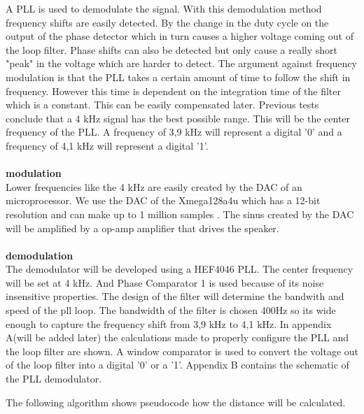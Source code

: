 \documentclass[10pt,a4paper]{article}
\begin{document}
A PLL is used to demodulate the signal. With this demodulation method frequency shifts are easily detected. By the change in the duty cycle on the output of the phase detector which in turn causes a higher voltage coming out of the loop filter. Phase shifts can also be detected but only cause a really short "peak" in the voltage which are harder to detect. The argument against frequency modulation is that the PLL takes a certain amount of time to follow the shift in frequency. However this time is dependent on the integration time of the filter which is a constant. This can be easily compensated later. Previous tests conclude that a 4 kHz signal has the best possible range. This will be the center frequency of the PLL. A frequency of 3,9 kHz will represent a digital '0' and a frequency of 4,1 kHz will represent a digital '1'.\\\\
\textbf{modulation}\\
Lower frequencies like the 4 kHz are easily created by the DAC of an microprocessor. We use the DAC of the Xmega128a4u which has a 12-bit resolution and can make up to 1 million samples \cite{xmegadata}. The sinus created by the DAC will be amplified by a op-amp amplifier that drives the speaker.\\\\
\textbf{demodulation}\\
The demodulator will be developed using a HEF4046 PLL. The center frequency will be set at 4 kHz. And Phase Comparator 1 is used because of its noise insensitive properties\cite{plldesign}. The design of the filter will determine the bandwith and speed of the pll loop.\cite{plldavid} The bandwidth of the filter is chosen 400Hz so its wide enough to capture the frequency shift from 3,9 kHz to 4,1 kHz. In appendix A(will be added later) the calculations made to properly configure the PLL and the loop filter are shown. A window comparator is used to convert the voltage out of the loop filter into a digital '0' or a '1'. Appendix B contains the schematic of the PLL demodulator.



The following algorithm shows pseudocode how the distance will be calculated.

\end{document}
